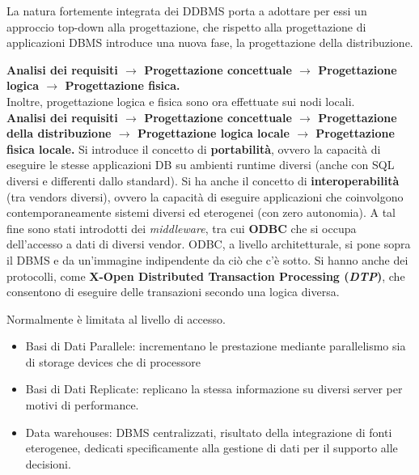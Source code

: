 La natura fortemente integrata dei DDBMS porta a adottare per essi un approccio top-down alla progettazione, che rispetto alla progettazione di applicazioni DBMS introduce una nuova fase, la progettazione della distribuzione.

\textbf{Analisi dei requisiti $\to$ Progettazione concettuale $\to$ Progettazione logica $\to$ Progettazione fisica.\\}
Inoltre, progettazione logica e fisica sono ora effettuate sui nodi locali.\\
\textbf{Analisi dei requisiti $\to$ Progettazione concettuale $\to$ Progettazione della distribuzione $\to$ Progettazione logica locale $\to$ Progettazione fisica locale.}
 \newline \newline
Si introduce il concetto di \textbf{portabilità}, ovvero la capacità di eseguire le stesse applicazioni DB su ambienti runtime diversi (anche con SQL diversi e differenti dallo standard). 
Si ha anche il concetto di \textbf{interoperabilità} (tra vendors diversi), ovvero la capacità di eseguire applicazioni che coinvolgono contemporaneamente sistemi diversi ed eterogenei (con zero autonomia). A tal fine sono stati introdotti dei \textit{middleware}, tra cui \textbf{ODBC} che si occupa dell'accesso a dati di diversi vendor. ODBC, a livello architetturale, si pone sopra il DBMS e da un'immagine indipendente da ciò che c'è sotto. Si hanno anche dei protocolli, come \textbf{X-Open Distributed Transaction Processing (\textit{DTP})}, che consentono di eseguire delle transazioni secondo una logica diversa.

Normalmente è limitata al livello di accesso.
\begin{itemize}
    \item Basi di Dati Parallele: incrementano le prestazione mediante parallelismo sia di storage devices che di processore
    \item Basi di Dati Replicate: replicano la stessa informazione su diversi server per motivi di performance.
    \item Data warehouses: DBMS centralizzati, risultato della integrazione di fonti eterogenee, dedicati specificamente alla gestione di dati per il supporto alle decisioni.
\end{itemize}



